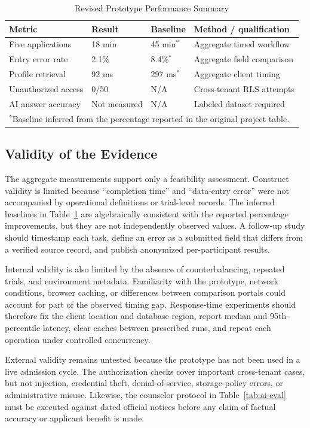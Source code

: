 \documentclass[conference,letterpaper]{IEEEtran}
\begin{document}
\begin{table}[!t]
\caption{Revised Prototype Performance Summary}
\label{tab:performance}
\centering\scriptsize
\setlength{\tabcolsep}{1.8pt}\renewcommand{\arraystretch}{1.03}
\begin{tabularx}{\columnwidth}{@{}X l l X@{}}
\toprule
Metric & Result & Baseline & Method / qualification\\
\midrule
Five applications & 18 min & 45 min$^*$ & Aggregate timed workflow\\
Entry error rate & 2.1\% & 8.4\%$^*$ & Aggregate field comparison\\
Profile retrieval & 92 ms & 297 ms$^*$ & Aggregate client timing\\
Unauthorized access & 0/50 & N/A & Cross-tenant RLS attempts\\
AI answer accuracy & Not measured & N/A & Labeled dataset required\\
\bottomrule
\multicolumn{4}{l}{\scriptsize $^*$Baseline inferred from the percentage reported in the original project table.}
\end{tabularx}
\end{table}

\subsection{Validity of the Evidence}
The aggregate measurements support only a feasibility assessment. Construct validity is limited because “completion time” and “data-entry error” were not accompanied by operational definitions or trial-level records. The inferred baselines in Table~\ref{tab:performance} are algebraically consistent with the reported percentage improvements, but they are not independently observed values. A follow-up study should timestamp each task, define an error as a submitted field that differs from a verified source record, and publish anonymized per-participant results.

Internal validity is also limited by the absence of counterbalancing, repeated trials, and environment metadata. Familiarity with the prototype, network conditions, browser caching, or differences between comparison portals could account for part of the observed timing gap. Response-time experiments should therefore fix the client location and database region, report median and 95th-percentile latency, clear caches between prescribed runs, and repeat each operation under controlled concurrency.

External validity remains untested because the prototype has not been used in a live admission cycle. The authorization checks cover important cross-tenant cases, but not injection, credential theft, denial-of-service, storage-policy errors, or administrative misuse. Likewise, the counselor protocol in Table~\ref{tab:ai-eval} must be executed against dated official notices before any claim of factual accuracy or applicant benefit is made.
\end{document}

